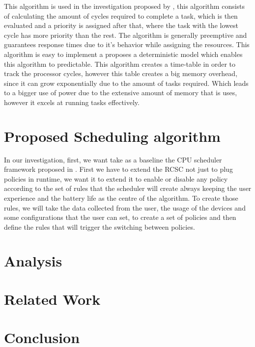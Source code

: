 \documentclass[conference]{IEEEtran}
\begin{document}
This algorithm is used in the investigation proposed by \cite{BECKER01}, this algorithm consists of calculating the amount of cycles required to complete a task, which is then evaluated and a priority is assigned after that, where the task with the lowest cycle has more priority than the rest. The algorithm is generally preemptive and guarantees response times due to it's behavior while assigning the resources. 
This algorithm is easy to implement a proposes a deterministic model which enables this algorithm to predictable. This algorithm creates a time-table in order to track the processor cycles, however this table creates a big memory overhead, since it can grow exponentially due to the amount of tasks required. Which leads to a bigger use of power due to the extensive amount of memory that is uses, however it excels at running tasks effectively. 


\section{Proposed Scheduling algorithm}


In our investigation, first, we want take as a baseline the CPU scheduler framework proposed in \cite{ALMA01}. First we have to extend the RCSC not just to plug policies in runtime, we want it to extend it to enable or disable any policy according to the set of rules that the scheduler will create always keeping the user experience and the battery life as the centre of the algorithm. To create those rules, we will take the data collected from the user, the usage of the devices and some configurations that the user can set, to create a set of policies and then define the rules that will trigger the switching between policies.

\section{Analysis}

\section{Related Work}

\section{Conclusion}


\nocite{*}


\end{document}
